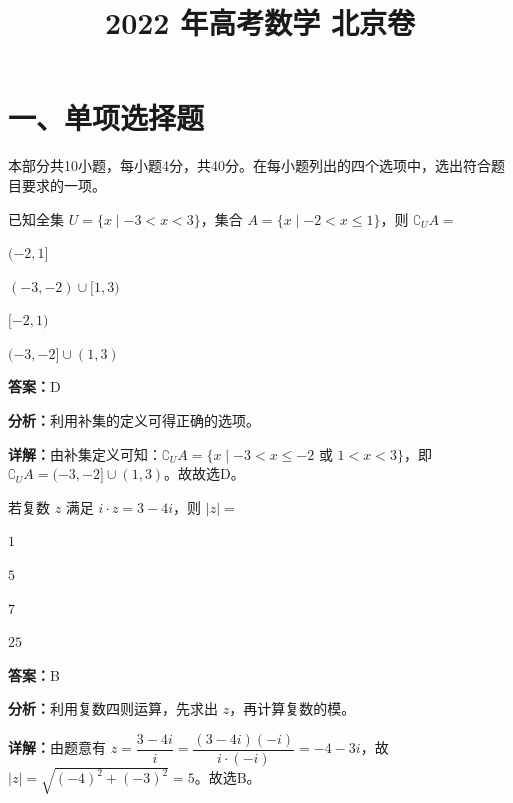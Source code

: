 ﻿\title{2022 年高考数学 北京卷}
\date{}
\maketitle

\section*{一、单项选择题}
本部分共10小题，每小题4分，共40分。在每小题列出的四个选项中，选出符合题目要求的一项。

\begin{question}[points=4]
已知全集 $U = \{x \mid -3 < x < 3\}$，集合 $A = \{x \mid -2 < x \leq 1\}$，则 $\complement_U A =$
\begin{choices}
  \item $(-2,1]$
  \item $(-3,-2) \cup [1,3)$
  \item $[-2,1)$
  \item $(-3,-2] \cup (1,3)$
\end{choices}
\begin{solution}
\textbf{答案：}D

\textbf{分析：}利用补集的定义可得正确的选项。

\textbf{详解：}由补集定义可知：$\complement_U A = \{x \mid -3 < x \leq -2 \text{ 或 } 1 < x < 3\}$，即 $\complement_U A = (-3,-2] \cup (1,3)$。故故选D。
\end{solution}
\end{question}

\begin{question}[points=4]
若复数 $z$ 满足 $i \cdot z = 3 - 4i$，则 $|z| =$
\begin{choices}
  \item $1$
  \item $5$
  \item $7$
  \item $25$
\end{choices}
\begin{solution}
\textbf{答案：}B

\textbf{分析：}利用复数四则运算，先求出 $z$，再计算复数的模。

\textbf{详解：}由题意有 $z = \dfrac{3-4i}{i} = \dfrac{(3-4i)(-i)}{i \cdot (-i)} = -4-3i$，故 $|z| = \sqrt{(-4)^2 + (-3)^2} = 5$。故选B。
\end{solution}
\end{question}


